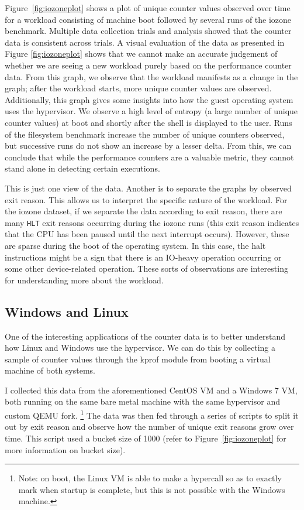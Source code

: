 \documentclass[notitlepage]{article}
\begin{document}
Figure~\ref{fig:iozoneplot} shows a plot of unique counter values observed over
time for a workload consisting of machine boot followed by several runs of the
iozone benchmark. Multiple data collection trials and analysis showed that the
counter data is consistent across trials. A visual evaluation of the data as
presented in Figure \ref{fig:iozoneplot} shows that we cannot make an accurate
judgement of whether we are seeing a new workload purely based on the
performance counter data. From this graph, we observe that the workload
manifests as a change in the graph; after the workload starts, more unique
counter values are observed.  Additionally, this graph gives some insights into
how the guest operating system uses the hypervisor. We observe a high level of
entropy (a large number of unique counter values) at boot and shortly after the
shell is displayed to the user. Runs of the filesystem benchmark increase the
number of unique counters observed, but successive runs do not show an increase
by a lesser delta. From this, we can conclude that while the performance
counters are a valuable metric, they cannot stand alone in detecting certain
executions.

This is just one view of the data. Another is to separate the graphs by observed
exit reason. This allows us to interpret the specific nature of the workload.
For the iozone dataset, if we separate the data according to exit reason, there
are many \texttt{HLT} exit reasons occurring during the iozone runs (this exit
reason indicates that the CPU has been paused until the next interrupt occurs).
However, these are sparse during the boot of the operating system. In this case,
the halt instructions might be a sign that there is an IO-heavy operation
occurring or some other device-related operation. These sorts of observations
are interesting for understanding more about the workload.

\subsection{Windows and Linux}
One of the interesting applications of the counter data is to better understand
how Linux and Windows use the hypervisor. We can do this by collecting a sample
of counter values through the kprof module from booting a virtual machine of
both systems.

I collected this data from the aforementioned CentOS VM and a Windows 7 VM, both
running on the same bare metal machine with the same hypervisor and custom QEMU
fork. \footnote{Note: on boot, the Linux VM is able to make a hypercall so as to
    exactly mark when startup is complete, but this is not possible with the
Windows machine.} The data was then fed through a series of scripts to split it
out by exit reason and observe how the number of unique exit reasons grow over
time. This script used a bucket size of 1000 (refer to
Figure~\ref{fig:iozoneplot} for more information on bucket size).
\end{document}
